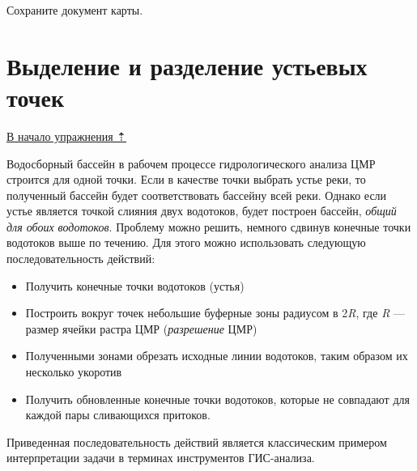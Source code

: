 \documentclass[12pt,]{book}
\begin{document}
Сохраните документ карты.

\hypertarget{dem-mouth}{%
\section{Выделение и разделение устьевых точек}\label{dem-mouth}}

\protect\hyperlink{dem}{В начало упражнения ⇡}

Водосборный бассейн в рабочем процессе гидрологического анализа ЦМР строится для одной точки. Если в качестве точки выбрать устье реки, то полученный бассейн будет соответствовать бассейну всей реки. Однако если устье является точкой слияния двух водотоков, будет построен бассейн, \emph{общий для обоих водотоков}. Проблему можно решить, немного сдвинув конечные точки водотоков выше по течению. Для этого можно использовать следующую последовательность действий:

\begin{itemize}
\item
  Получить конечные точки водотоков (устья)
\item
  Построить вокруг точек небольшие буферные зоны радиусом в 2\emph{R}, где \emph{R} --- размер ячейки растра ЦМР (\emph{разрешение} ЦМР)
\item
  Полученными зонами обрезать исходные линии водотоков, таким образом их несколько укоротив
\item
  Получить обновленные конечные точки водотоков, которые не совпадают для каждой пары сливающихся притоков.
\end{itemize}

Приведенная последовательность действий является классическим примером интерпретации задачи в терминах инструментов ГИС-анализа.
\end{document}
